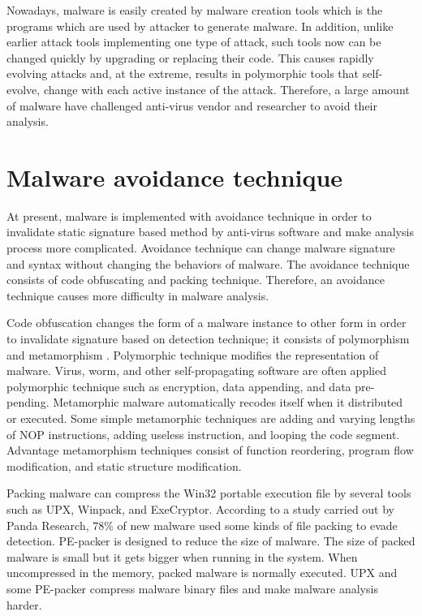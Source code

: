 Nowadays, malware is easily created by malware creation tools which is the programs which are used by attacker to generate malware\cite{Microsoft}. In addition, unlike earlier attack tools implementing one type of attack, such tools now can be changed quickly by upgrading or replacing their code. This causes rapidly evolving attacks and, at the extreme, results in polymorphic tools that self-evolve, change with each active instance of the attack. Therefore, a large amount of malware have challenged anti-virus vendor and researcher to avoid their analysis.

\section{Malware avoidance technique}

At present, malware is implemented with avoidance technique in order to invalidate static signature based method by anti-virus software and make analysis process more complicated. Avoidance technique can change malware signature and syntax without changing the behaviors of malware. The avoidance technique consists of code obfuscating and packing technique. Therefore, an avoidance technique causes more difficulty in malware analysis. 
 
Code obfuscation changes the form of a malware instance to other form in order to invalidate signature based on detection technique; it consists of polymorphism and metamorphism \cite{blackhat1}. Polymorphic technique modifies the representation of malware. Virus, worm, and other self-propagating software are often applied polymorphic technique such as encryption, data appending, and data pre-pending.  Metamorphic malware automatically recodes itself when it distributed or executed\cite{blackhat1}. Some simple metamorphic techniques are adding and varying lengths of NOP instructions, adding useless instruction, and looping the code segment. Advantage metamorphism techniques consist of function reordering, program flow modification, and static structure modification.

Packing malware can compress the Win32 portable execution file by several tools such as UPX, Winpack, and ExeCryptor. According to a study carried out by Panda Research, $78$\% of new malware used some kinds of file packing to evade detection. PE-packer is designed to reduce the size of malware. The size of packed malware is small but it gets bigger when running in the system\cite{packing}. When uncompressed in the memory, packed malware is normally executed. UPX and some PE-packer compress malware binary files and make malware analysis harder.


